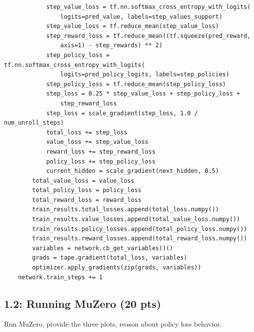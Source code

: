 \documentclass[12pt]{article}
\begin{document}
\begin{tcolorbox}[height=50em, width=\textwidth]
\begin{center}
    \begin{verbatim}
            step_value_loss = tf.nn.softmax_cross_entropy_with_logits(
                logits=pred_value, labels=step_values_support)
            step_value_loss = tf.reduce_mean(step_value_loss)
            step_reward_loss = tf.reduce_mean((tf.squeeze(pred_reward,
                axis=1) - step_rewards) ** 2)
            step_policy_loss = tf.nn.softmax_cross_entropy_with_logits(
                logits=pred_policy_logits, labels=step_policies)
            step_policy_loss = tf.reduce_mean(step_policy_loss)
            step_loss = 0.25 * step_value_loss + step_policy_loss +
                step_reward_loss
            step_loss = scale_gradient(step_loss, 1.0 / num_unroll_steps)
            total_loss += step_loss
            value_loss += step_value_loss
            reward_loss += step_reward_loss
            policy_loss += step_policy_loss
            current_hidden = scale_gradient(next_hidden, 0.5)
        total_value_loss = value_loss
        total_policy_loss = policy_loss
        total_reward_loss = reward_loss
        train_results.total_losses.append(total_loss.numpy())
        train_results.value_losses.append(total_value_loss.numpy())
        train_results.policy_losses.append(total_policy_loss.numpy())
        train_results.reward_losses.append(total_reward_loss.numpy())
        variables = network.cb_get_variables()()
        grads = tape.gradient(total_loss, variables)
        optimizer.apply_gradients(zip(grads, variables))
    network.train_steps += 1
    \end{verbatim}
\end{center}
\end{tcolorbox}
\newpage



\subsection*{1.2: Running MuZero (20 pts)}
Run MuZero, provide the three plots, reason about policy loss behavior.
\end{document}
